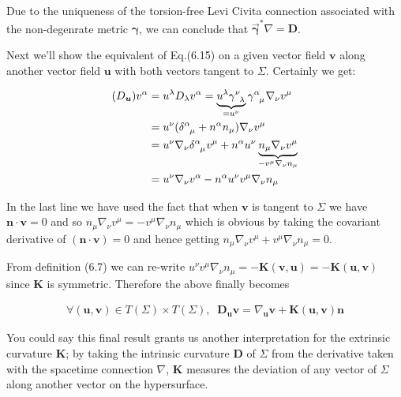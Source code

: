 \documentclass[12pt]{article}
\renewcommand{\vec}[1]{\bm{#1}}
\numberwithin{equation}{section}
\numberwithin{theorem}{subsection}
\begin{document}
Due to the uniqueness of the torsion-free Levi Civita connection associated with the non-degenrate metric $\vec{\gamma}$, we can conclude that $\overrightarrow{\vec{\gamma}}^{*}\nabla=\vec{D}$.

Next we'll show the equivalent of Eq.(6.15) on a given vector field $\vec{v}$ along another vector field $\vec{u}$ with both vectors tangent to $\Sigma$. Certainly we get:

\begin{align*}

    (D_{\vec{u}})v^{\alpha} &= u^{\lambda}D_{\lambda}v^{\alpha} = \underbrace{u^{\lambda}\tensor{\gamma}{^\nu_\lambda}}_{= u^{\nu}}\tensor{\gamma}{^\alpha_\mu}\nabla_{\nu}v^{\mu} \\ &= u^{\nu}(\tensor{\delta}{^\alpha_\mu}+n^{\alpha}n_{\mu})\nabla_{\nu}v^{\mu} \\ &= u^{\nu}\nabla_{\nu}\tensor{\delta}{^\alpha_\mu}v^{\mu}+ n^{\alpha}u^{\nu}\underbrace{n_{\mu}\nabla_{\nu}v^{\mu}}_{-v^{\mu}\nabla_{\nu}n_{\mu}} \\ &= u^{\nu}\nabla_{\nu}v^{\alpha} - n^{\alpha}u^{\nu}v^{\mu}\nabla_{\nu}n_{\mu}

\end{align*}

In the last line we have used the fact that when $\vec{v}$ is tangent to $\Sigma$ we have $\vec{n}\cdot\vec{v} = 0$ and so $n_{\mu}\nabla_{\nu}v^{\mu}=-v^{\mu}\nabla_{\nu}n_{\mu}$ which is obvious by taking the covariant derivative of $(\vec{n} \cdot \vec{v}) = 0$ and hence getting $n_{\mu}\nabla_{\nu}v^{\mu} + v^{\mu}\nabla_{\nu}n_{\mu} = 0$.

\newline From definition (6.7) we can re-write $u^{\nu}v^{\mu}\nabla_{\nu}n_{\mu} = -\vec{K}(\vec{v},\vec{u}) =-\vec{K}(\vec{u},\vec{v}) $ since $\vec{K}$ is symmetric. Therefore the above finally becomes

\begin{align}

    \forall (\vec{u},\vec{v}) \in T(\Sigma) \times T(\Sigma), \; \;

    \boxed{\vec{D}_{\vec{u}}\vec{v} = \nabla_{\vec{u}}\vec{v} + \vec{K}(\vec{u},\vec{v})\vec{n}}

\end{align}

You could say this final result grants us another interpretation for the extrinsic curvature $\vec{K}$; by taking the intrinsic curvature $\vec{D}$ of $\Sigma$ from the derivative taken with the spacetime connection $\nabla$, $\vec{K}$ measures the deviation of any vector of $\Sigma$ along another vector on the hypersurface.
\end{document}
